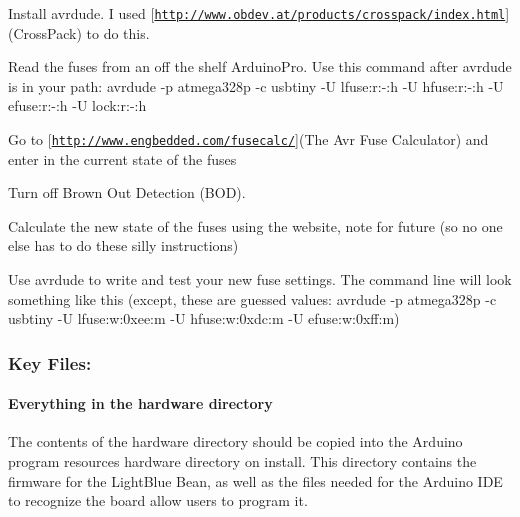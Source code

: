 \begin{DoxyEnumerate}
\item Install avrdude. I used \mbox{[}\href{http://www.obdev.at/products/crosspack/index.html}{\tt http\+://www.\+obdev.\+at/products/crosspack/index.\+html}\mbox{]}(Cross\+Pack) to do this.
\end{DoxyEnumerate}
\begin{DoxyEnumerate}
\item Read the fuses from an off the shelf Arduino\+Pro. Use this command after avrdude is in your path\+: {\ttfamily avrdude -\/p atmega328p -\/c usbtiny -\/U lfuse\+:r\+:-\/\+:h -\/U hfuse\+:r\+:-\/\+:h -\/U efuse\+:r\+:-\/\+:h -\/U lock\+:r\+:-\/\+:h}
\end{DoxyEnumerate}
\begin{DoxyEnumerate}
\item Go to \mbox{[}\href{http://www.engbedded.com/fusecalc/}{\tt http\+://www.\+engbedded.\+com/fusecalc/}\mbox{]}(The Avr Fuse Calculator) and enter in the current state of the fuses
\end{DoxyEnumerate}
\begin{DoxyEnumerate}
\item Turn off Brown Out Detection (B\+OD).
\end{DoxyEnumerate}
\begin{DoxyEnumerate}
\item Calculate the new state of the fuses using the website, note for future (so no one else has to do these silly instructions)
\end{DoxyEnumerate}
\begin{DoxyEnumerate}
\item Use avrdude to write and test your new fuse settings. The command line will look something like this (except, these are guessed values\+: {\ttfamily avrdude -\/p atmega328p -\/c usbtiny -\/U lfuse\+:w\+:0xee\+:m -\/U hfuse\+:w\+:0xdc\+:m -\/U efuse\+:w\+:0xff\+:m})
\end{DoxyEnumerate}

\subsubsection*{Key Files\+:}

\paragraph*{Everything in the {\ttfamily hardware} directory}

The contents of the hardware directory should be copied into the Arduino program resources hardware directory on install. This directory contains the firmware for the Light\+Blue Bean, as well as the files needed for the Arduino I\+DE to recognize the board allow users to program it.

